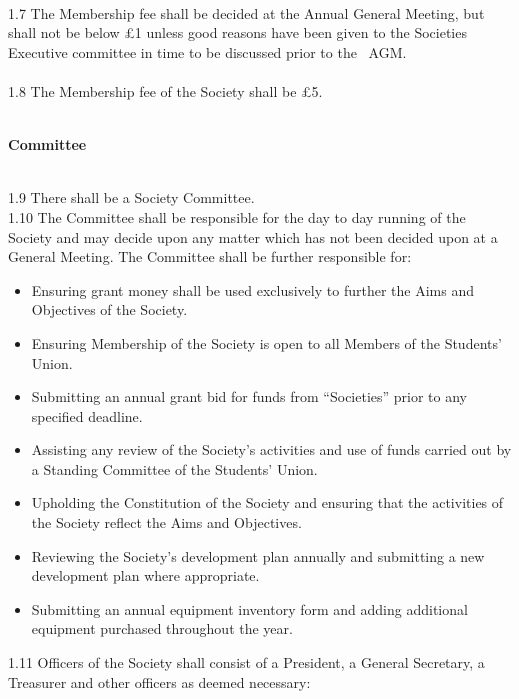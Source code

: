 \documentclass[a4paper,twoside,notitlepage,11pt]{article}
\newcommand{\consHead}[1]{\begin{Large}\textbf{#1}\end{Large}\ \\}
\begin{document}
\ \\
1.7 The Membership fee shall be decided at the Annual General Meeting, but shall not be below \pounds 1 unless good reasons have been given to the Societies Executive committee in time to be discussed prior to the \ AGM.\ \\
\ \\
1.8 The Membership fee of the Society shall be \pounds 5.
\ \\
\ \\
\consHead{Committee}
1.9 There shall be a Society Committee.\ \\
\newpage
{}
1.10 The Committee shall be responsible for the day to day running of the Society and may decide upon any matter which has not been decided upon at a General Meeting. The Committee shall be further responsible for:
\begin{itemize}
	\item Ensuring grant money shall be used exclusively to further the Aims and Objectives of the Society.
	\item Ensuring Membership of the Society is open to all Members of the Students' Union.
	\item Submitting an annual grant bid for funds from ``Societies'' prior to any specified deadline.
	\item Assisting any review of the Society's activities and use of funds carried out by a Standing Committee of the Students' Union.
	\item Upholding the Constitution of the Society and ensuring that the activities of the Society reflect the Aims and Objectives.
	\item Reviewing the Society's development plan annually and submitting a new development plan where appropriate.
	\item Submitting an annual equipment inventory form and adding additional equipment purchased throughout the year.
\end{itemize}
1.11 Officers of the Society shall consist of a President, a General Secretary, a Treasurer and other officers as deemed necessary:
\end{document}
